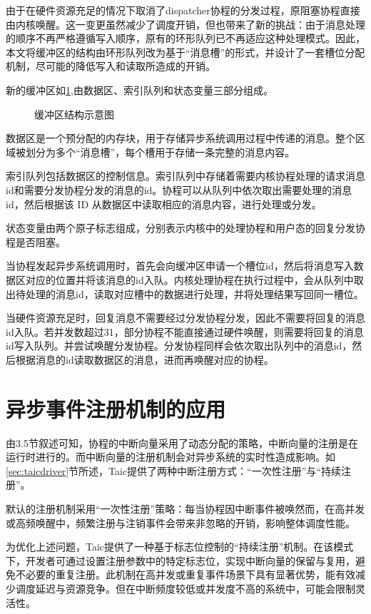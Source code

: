 由于在硬件资源充足的情况下取消了dispatcher协程的分发过程，原阻塞协程直接由内核唤醒。这一变更虽然减少了调度开销，但也带来了新的挑战：由于消息处理的顺序不再严格遵循写入顺序，原有的环形队列已不再适应这种处理模式。因此，本文将缓冲区的结构由环形队列改为基于“消息槽”的形式，并设计了一套槽位分配机制，尽可能的降低写入和读取所造成的开销。

新的缓冲区如\ref{bufferarch},由数据区、索引队列和状态变量三部分组成。

\begin{figure}[htbp]
    \centering
    
    \caption{缓冲区结构示意图}\label{bufferarch}
\end{figure}

数据区是一个预分配的内存块，用于存储异步系统调用过程中传递的消息。整个区域被划分为多个“消息槽”，每个槽用于存储一条完整的消息内容。

索引队列包括数据区的控制信息。索引队列中存储着需要内核协程处理的请求消息id和需要分发协程分发的消息的id。协程可以从队列中依次取出需要处理的消息id，然后根据该 ID 从数据区中读取相应的消息内容，进行处理或分发。

状态变量由两个原子标志组成，分别表示内核中的处理协程和用户态的回复分发协程是否阻塞\cite{2014Rusr}。

当协程发起异步系统调用时，首先会向缓冲区申请一个槽位id，然后将消息写入数据区对应的位置并将该消息的id入队。内核处理协程在执行过程中，会从队列中取出待处理的消息id，读取对应槽中的数据进行处理，并将处理结果写回同一槽位。

当硬件资源充足时，回复消息不需要经过分发协程分发，因此不需要将回复的消息id入队。若并发数超过31，部分协程不能直接通过硬件唤醒，则需要将回复的消息id写入队列。并尝试唤醒分发协程。分发协程同样会依次取出队列中的消息id，然后根据消息的id读取数据区的消息，进而再唤醒对应的协程。

\section{异步事件注册机制的应用}

由3.5节叙述可知，协程的中断向量采用了动态分配的策略，中断向量的注册是在运行时进行的。而中断向量的注册机制会对异步系统的实时性造成影响。如\ref{sec:taicdriver}节所述，Taic提供了两种中断注册方式：“一次性注册”与“持续注册”。

默认的注册机制采用“一次性注册”策略：每当协程因中断事件被唤然而，在高并发或高频唤醒中，频繁注册与注销事件会带来非忽略的开销，影响整体调度性能。

为优化上述问题，Taic提供了一种基于标志位控制的“持续注册”机制。在该模式下，开发者可通过设置注册参数中的特定标志位，实现中断向量的保留与复用，避免不必要的重复注册。此机制在高并发或重复事件场景下具有显著优势，能有效减少调度延迟与资源竞争。但在中断频度较低或并发度不高的系统中，可能会限制灵活性。

